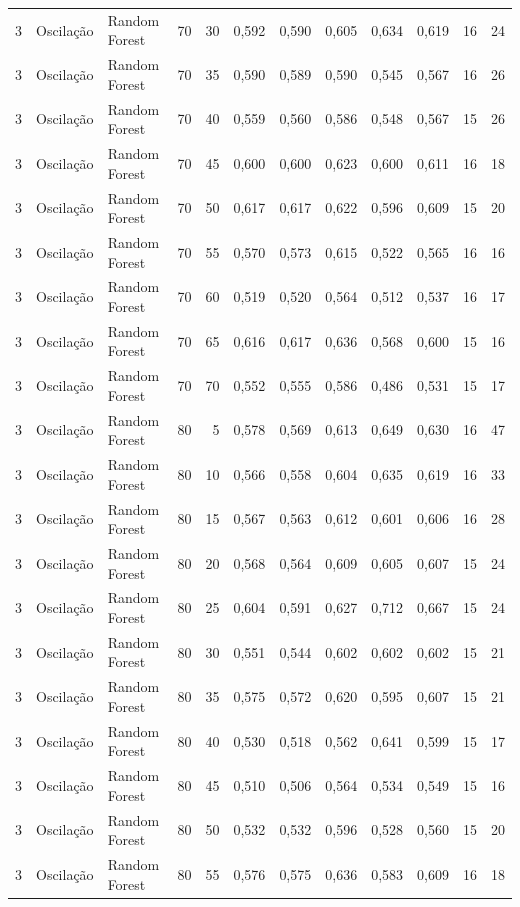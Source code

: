 \begin{longtable}{@{}rllrrrrrrrrr@{}}
3 & Oscilação & Random Forest & 70 & 30 & 0,592 & 0,590 & 0,605 & 0,634 & 0,619 & 16 & 24 \\
3 & Oscilação & Random Forest & 70 & 35 & 0,590 & 0,589 & 0,590 & 0,545 & 0,567 & 16 & 26 \\
3 & Oscilação & Random Forest & 70 & 40 & 0,559 & 0,560 & 0,586 & 0,548 & 0,567 & 15 & 26 \\
3 & Oscilação & Random Forest & 70 & 45 & 0,600 & 0,600 & 0,623 & 0,600 & 0,611 & 16 & 18 \\
3 & Oscilação & Random Forest & 70 & 50 & 0,617 & 0,617 & 0,622 & 0,596 & 0,609 & 15 & 20 \\
3 & Oscilação & Random Forest & 70 & 55 & 0,570 & 0,573 & 0,615 & 0,522 & 0,565 & 16 & 16 \\
3 & Oscilação & Random Forest & 70 & 60 & 0,519 & 0,520 & 0,564 & 0,512 & 0,537 & 16 & 17 \\
3 & Oscilação & Random Forest & 70 & 65 & 0,616 & 0,617 & 0,636 & 0,568 & 0,600 & 15 & 16 \\
3 & Oscilação & Random Forest & 70 & 70 & 0,552 & 0,555 & 0,586 & 0,486 & 0,531 & 15 & 17 \\
3 & Oscilação & Random Forest & 80 & 5 & 0,578 & 0,569 & 0,613 & 0,649 & 0,630 & 16 & 47 \\
3 & Oscilação & Random Forest & 80 & 10 & 0,566 & 0,558 & 0,604 & 0,635 & 0,619 & 16 & 33 \\
3 & Oscilação & Random Forest & 80 & 15 & 0,567 & 0,563 & 0,612 & 0,601 & 0,606 & 16 & 28 \\
3 & Oscilação & Random Forest & 80 & 20 & 0,568 & 0,564 & 0,609 & 0,605 & 0,607 & 15 & 24 \\
3 & Oscilação & Random Forest & 80 & 25 & 0,604 & 0,591 & 0,627 & 0,712 & 0,667 & 15 & 24 \\
3 & Oscilação & Random Forest & 80 & 30 & 0,551 & 0,544 & 0,602 & 0,602 & 0,602 & 15 & 21 \\
3 & Oscilação & Random Forest & 80 & 35 & 0,575 & 0,572 & 0,620 & 0,595 & 0,607 & 15 & 21 \\
3 & Oscilação & Random Forest & 80 & 40 & 0,530 & 0,518 & 0,562 & 0,641 & 0,599 & 15 & 17 \\
3 & Oscilação & Random Forest & 80 & 45 & 0,510 & 0,506 & 0,564 & 0,534 & 0,549 & 15 & 16 \\
3 & Oscilação & Random Forest & 80 & 50 & 0,532 & 0,532 & 0,596 & 0,528 & 0,560 & 15 & 20 \\
3 & Oscilação & Random Forest & 80 & 55 & 0,576 & 0,575 & 0,636 & 0,583 & 0,609 & 16 & 18 \\

\end{longtable}
